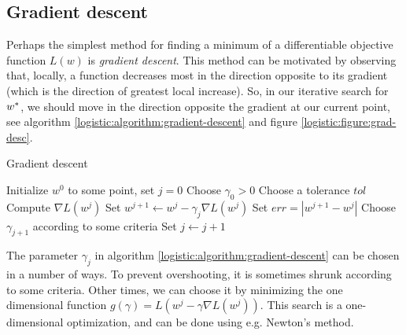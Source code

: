 \subsection{Gradient descent}
Perhaps the simplest method for finding a minimum of a differentiable objective function $L(w)$ is \emph{gradient descent}.  This method can be motivated by observing that, locally, a function decreases most in the direction opposite to its gradient (which is the direction of greatest local increase).  So, in our iterative search for ${w^\ast}$, we should move in the direction opposite the gradient at our current point, see algorithm \ref{logistic:algorithm:gradient-descent} and figure \ref{logistic:figure:grad-desc}.
\begin{algorithm}
  \label{logistic:algorithm:gradient-descent}
  \caption{Gradient descent}
\begin{algorithmic}
  \State Initialize $w^0$ to some point, set $j=0$
  \State Choose $\gamma_0>0$
  \State Choose a tolerance $tol$
    \State Compute $\nabla L(w^j)$
    \State Set $w^{j+1} \gets w^j - \gamma_j\nabla L(w^j)$
    \State Set $err = |w^{j+1} - w^j|$
    \State Choose $\gamma_{j+1}$ according to some criteria
    \State Set $j\gets j+1$
  \EndWhile
\EndWhile
\end{algorithmic}
\end{algorithm}
The parameter $\gamma_j$ in algorithm \ref{logistic:algorithm:gradient-descent} can be chosen in a number of ways.  
To prevent overshooting, it is sometimes shrunk according to some criteria.  Other times, we can choose it by minimizing the one dimensional function $g(\gamma) = L(w^j - \gamma \nabla L(w^j))$.  This search is a one-dimensional optimization, and can be done using e.g. Newton's method.
